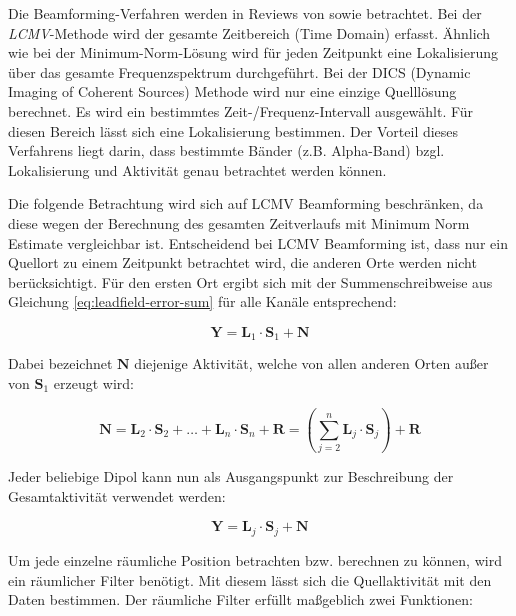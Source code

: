 \documentclass[doc,a4paper,12pt]{apa6}
\newcommand{\mx}[1]{\mathbf{#1}}
\begin{document}
Die Beamforming-Verfahren werden in Reviews von \textcite{hillebrand2005beamformer} sowie \textcite{hillebrand2005new} betrachtet. Bei der \emph{LCMV}-Methode \parencite[\emph{Linearly Constrained Minimum Variance Beamforming}, eingeführt von][]{van1997localization} wird der gesamte Zeitbereich (Time Domain) erfasst. Ähnlich wie bei der Minimum-Norm-Lösung wird für jeden Zeitpunkt eine Lokalisierung über das gesamte Frequenzspektrum durchgeführt. Bei der DICS (Dynamic Imaging of Coherent Sources) Methode wird nur eine einzige Quelllösung berechnet. Es wird ein bestimmtes Zeit-/Frequenz-Intervall ausgewählt. Für diesen Bereich lässt sich eine Lokalisierung bestimmen. Der Vorteil dieses Verfahrens liegt darin, dass bestimmte Bänder (z.B. Alpha-Band) bzgl. Lokalisierung und Aktivität genau betrachtet werden können.

Die folgende Betrachtung wird sich auf LCMV Beamforming beschränken, da diese wegen der Berechnung des gesamten Zeitverlaufs mit Minimum Norm Estimate vergleichbar ist. Entscheidend bei LCMV Beamforming ist, dass nur ein Quellort zu einem Zeitpunkt betrachtet wird, die anderen Orte werden nicht berücksichtigt. Für den ersten Ort ergibt sich mit der Summenschreibweise aus Gleichung \ref{eq:leadfield-error-sum} für alle Kanäle entsprechend:

\begin{equation}
\mx{Y} = \mx{L}_{1} \cdot \mx{S}_1 + \mx{N}
\end{equation}

Dabei bezeichnet $\mx{N}$ diejenige Aktivität, welche von allen anderen Orten außer von $\mx{S}_1$ erzeugt wird:

\begin{equation}
\mx{N} = \mx{L}_{2} \cdot \mx{S}_2 + \ldots + \mx{L}_{n} \cdot \mx{S}_n + \mx{R} = \left( \sum_{j=2}^n \mx{L}_{j} \cdot \mx{S}_j \right) + \mx{R}
\end{equation}

Jeder beliebige Dipol kann nun als Ausgangspunkt zur Beschreibung der Gesamtaktivität verwendet werden:

\begin{equation}
\label{eq:beam}
\mx{Y} = \mx{L}_{j} \cdot \mx{S}_j + \mx{N}
\end{equation}

Um jede einzelne räumliche Position betrachten bzw. berechnen zu können, wird ein räumlicher Filter benötigt. Mit diesem lässt sich die Quellaktivität mit den Daten bestimmen. Der räumliche Filter erfüllt maßgeblich zwei Funktionen:
\end{document}
